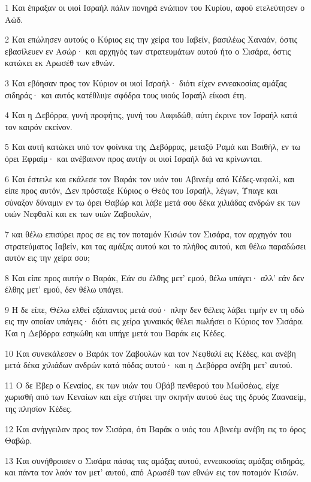 \par 1 Και έπραξαν οι υιοί Ισραήλ πάλιν πονηρά ενώπιον του Κυρίου, αφού ετελεύτησεν ο Αώδ.
\par 2 Και επώλησεν αυτούς ο Κύριος εις την χείρα του Ιαβείν, βασιλέως Χαναάν, όστις εβασίλευεν εν Ασώρ· και αρχηγός των στρατευμάτων αυτού ήτο ο Σισάρα, όστις κατώκει εκ Αρωσέθ των εθνών.
\par 3 Και εβόησαν προς τον Κύριον οι υιοί Ισραήλ· διότι είχεν εννεακοσίας αμάξας σιδηράς· και αυτός κατέθλιψε σφόδρα τους υιούς Ισραήλ είκοσι έτη.
\par 4 Και η Δεβόρρα, γυνή προφήτις, γυνή του Λαφιδώθ, αύτη έκρινε τον Ισραήλ κατά τον καιρόν εκείνον.
\par 5 Και αυτή κατώκει υπό τον φοίνικα της Δεβόρρας, μεταξύ Ραμά και Βαιθήλ, εν τω όρει Εφραΐμ· και ανέβαινον προς αυτήν οι υιοί Ισραήλ διά να κρίνωνται.
\par 6 Και έστειλε και εκάλεσε τον Βαράκ τον υιόν του Αβινεέμ από Κέδες-νεφαλί, και είπε προς αυτόν, Δεν πρόσταξε Κύριος ο Θεός του Ισραήλ, λέγων, Ύπαγε και σύναξον δύναμιν εν τω όρει Θαβώρ και λάβε μετά σου δέκα χιλιάδας ανδρών εκ των υιών Νεφθαλί και εκ των υιών Ζαβουλών,
\par 7 και θέλω επισύρει προς σε εις τον ποταμόν Κισών τον Σισάρα, τον αρχηγόν του στρατεύματος Ιαβείν, και τας αμάξας αυτού και το πλήθος αυτού, και θέλω παραδώσει αυτόν εις την χείρα σου;
\par 8 Και είπε προς αυτήν ο Βαράκ, Εάν συ έλθης μετ' εμού, θέλω υπάγει· αλλ' εάν δεν έλθης μετ' εμού, δεν θέλω υπάγει.
\par 9 Η δε είπε, Θέλω ελθεί εξάπαντος μετά σού· πλην δεν θέλεις λάβει τιμήν εν τη οδώ εις την οποίαν υπάγεις· διότι εις χείρα γυναικός θέλει πωλήσει ο Κύριος τον Σισάρα. Και η Δεβόρρα εσηκώθη και υπήγε μετά του Βαράκ εις Κέδες.
\par 10 Και συνεκάλεσεν ο Βαράκ τον Ζαβουλών και τον Νεφθαλί εις Κέδες, και ανέβη μετά δέκα χιλιάδων ανδρών κατά πόδας αυτού· και η Δεβόρρα ανέβη μετ' αυτού.
\par 11 Ο δε Έβερ ο Κεναίος, εκ των υιών του Οβάβ πενθερού του Μωϋσέως, είχε χωρισθή από των Κεναίων και είχε στήσει την σκηνήν αυτού έως της δρυός Ζααναείμ, της πλησίον Κέδες.
\par 12 Και ανήγγειλαν προς τον Σισάρα, ότι Βαράκ ο υιός του Αβινεέμ ανέβη εις το όρος Θαβώρ.
\par 13 Και συνήθροισεν ο Σισάρα πάσας τας αμάξας αυτού, εννεακοσίας αμάξας σιδηράς, και πάντα τον λαόν τον μετ' αυτού, από Αρωσέθ των εθνών εις τον ποταμόν Κισών.
